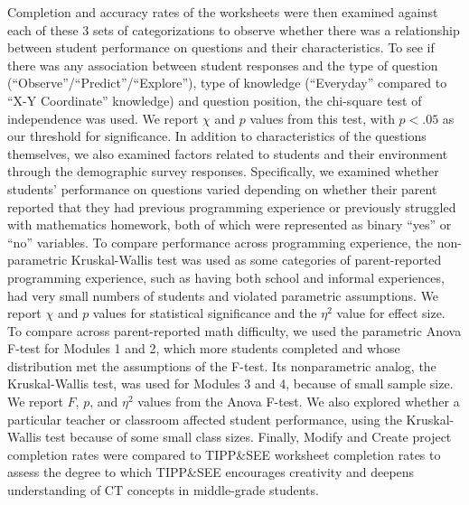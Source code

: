 \documentclass[sigconf,manuscript,review,anonymous]{acmart} %
\def\ts{TIPP\&SEE}
\begin{document}
Completion and accuracy rates of the worksheets were then examined against each of these 3 sets of categorizations to observe whether there was a relationship between student performance on questions and their characteristics. To see if there was any association between student responses and the type of question (``Observe''/``Predict''/``Explore''), type of knowledge (``Everyday'' compared to ``X-Y Coordinate'' knowledge) and question position, the chi-square test of independence was used. We report \begin{math}\chi\end{math} and \begin{math}p\end{math} values from this test, with \begin{math}p<.05\end{math} as our threshold for significance. In addition to characteristics of the questions themselves, we also examined factors related to students and their environment through the demographic survey responses. Specifically, we examined whether students' performance on questions varied depending on whether their parent reported that they had previous programming experience or previously struggled with mathematics homework, both of which were represented as binary ``yes'' or ``no'' variables. To compare performance across programming experience, the non-parametric Kruskal-Wallis test was used as some categories of parent-reported programming experience, such as having both school and informal experiences, had very small numbers of students and violated parametric assumptions. We report \begin{math}\chi\end{math} and \begin{math}p\end{math} values for statistical significance and the \begin{math}\eta^2\end{math} value for effect size. To compare across parent-reported math difficulty, we used the parametric Anova F-test for Modules 1 and 2, which more students completed and whose distribution met the assumptions of the F-test. Its nonparametric analog, the Kruskal-Wallis test, was used for Modules 3 and 4, because of small sample size. We report \begin{math}F\end{math}, \begin{math}p\end{math}, and \begin{math}\eta^2\end{math} values from the Anova F-test. We also explored whether a particular teacher or classroom affected student performance, using the Kruskal-Wallis test because of some small class sizes. Finally, Modify and Create project completion rates were compared to \ts{} worksheet completion rates to assess the degree to which \ts{} encourages creativity and deepens understanding of CT concepts in middle-grade students.
\end{document}
